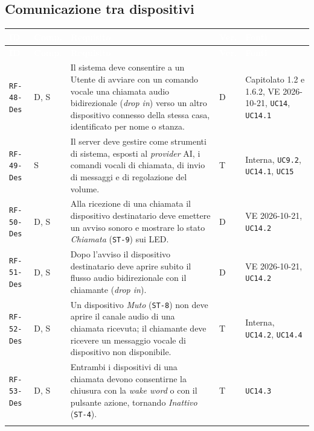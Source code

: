 \documentclass[12pt,a4paper]{article}
\newcommand{\thc}[1]{\textcolor{white}{\textbf{#1}}}
\newcommand{\rl}{\\ \arrayrulecolor{bfline}\hline}
\begin{document}
\subsection{Comunicazione tra dispositivi}
\begin{longtable}{>{\raggedright\arraybackslash}p{}>{\centering\arraybackslash}p{}>{\raggedright\arraybackslash}p{}>{\centering\arraybackslash}p{}>{\raggedright\arraybackslash}p{}}
\rowcolor{bfblue}\thc{ID} & \thc{Comp.} & \thc{Requisito} & \thc{Ver.} & \thc{Fonti} \\ \endfirsthead
\rowcolor{bfblue}\thc{ID} & \thc{Comp.} & \thc{Requisito} & \thc{Ver.} & \thc{Fonti} \\ \endhead
\texttt{RF-48-Des} & D, S & Il sistema deve consentire a un Utente di avviare con un comando vocale una chiamata audio bidirezionale (\emph{drop in}) verso un altro dispositivo connesso della stessa casa, identificato per nome o stanza. & D & Capitolato 1.2 e 1.6.2, VE 2026-10-21, \texttt{UC14}, \texttt{UC14.1} \rl

\texttt{RF-49-Des} & S & Il server deve gestire come strumenti di sistema, esposti al \emph{provider} AI, i comandi vocali di chiamata, di invio di messaggi e di regolazione del volume. & T & Interna, \texttt{UC9.2}, \texttt{UC14.1}, \texttt{UC15} \rl

\texttt{RF-50-Des} & D, S & Alla ricezione di una chiamata il dispositivo destinatario deve emettere un avviso sonoro e mostrare lo stato \emph{Chiamata} (\texttt{ST-9}) sui LED. & D & VE 2026-10-21, \texttt{UC14.2} \rl

\texttt{RF-51-Des} & D, S & Dopo l'avviso il dispositivo destinatario deve aprire subito il flusso audio bidirezionale con il chiamante (\emph{drop in}). & D & VE 2026-10-21, \texttt{UC14.2} \rl

\texttt{RF-52-Des} & D, S & Un dispositivo \emph{Muto} (\texttt{ST-8}) non deve aprire il canale audio di una chiamata ricevuta; il chiamante deve ricevere un messaggio vocale di dispositivo non disponibile. & T & Interna, \texttt{UC14.2}, \texttt{UC14.4} \rl

\texttt{RF-53-Des} & D, S & Entrambi i dispositivi di una chiamata devono consentirne la chiusura con la \emph{wake word} o con il pulsante azione, tornando \emph{Inattivo} (\texttt{ST-4}). & T & \texttt{UC14.3} \rl


\end{longtable}
\end{document}

